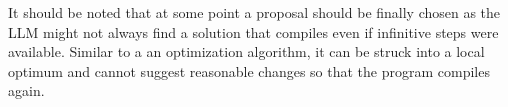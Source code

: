 It should be noted that at some point a proposal should be finally chosen as the \ac{LLM} might not always find a solution that compiles even if infinitive steps were available. Similar to a an optimization algorithm, it can be struck into a local optimum and cannot suggest reasonable changes so that the program compiles again.  